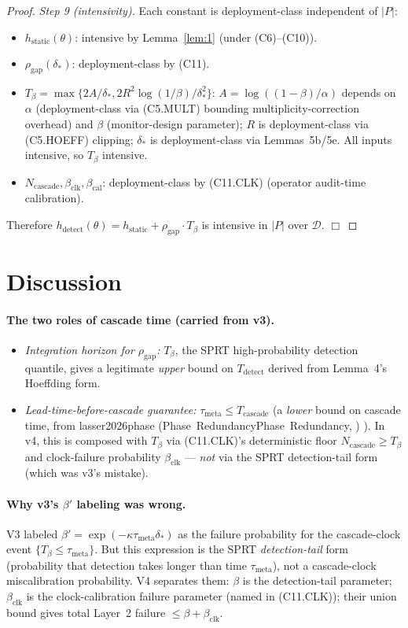 \documentclass{article}
\makeatletter
\newcommand{\citep}[2][]{%
  \begingroup
  \def\@tmpkey{#2}%
  \ifx\@tmpkey\@empty\else
    (\ifx\@empty#1\@empty\else #1, \fi
     \@nameuse{bibkey@\@tmpkey})%
  \fi
  \endgroup
}
\newcommand{\deltastar}{\delta_{*}}
\newcommand{\rhogap}{\rho_{\mathrm{gap}}}
\newcommand{\Tbeta}{T_{\beta}}
\newcommand{\Ncasc}{N_{\mathrm{cascade}}}
\newcommand{\bclk}{\beta_{\mathrm{clk}}}
\newcommand{\bcal}{\beta_{\mathrm{cal}}}
\makeatother
\begin{document}
\begin{proof}
\emph{Step 9 (intensivity).}  Each constant is deployment-class
independent of $|P|$:
\begin{itemize}
\item $h_{\mathrm{static}}(\theta)$: intensive by Lemma~\ref{lem:1}
  (under (C6)--(C10)).
\item $\rhogap(\deltastar)$: deployment-class by (C11).
\item $\Tbeta = \max\{2A/\deltastar, 2R^2\log(1/\beta)/\deltastar^2\}$:
  $A = \log((1-\beta)/\alpha)$ depends on $\alpha$ (deployment-class
  via (C5.MULT) bounding multiplicity-correction overhead) and
  $\beta$ (monitor-design parameter); $R$ is deployment-class via
  (C5.HOEFF) clipping; $\deltastar$ is deployment-class via
  Lemmas~5b/5e.  All inputs intensive, so $\Tbeta$ intensive.
\item $\Ncasc, \bclk, \bcal$: deployment-class by (C11.CLK)
  (operator audit-time calibration).
\end{itemize}
Therefore $h_{\mathrm{detect}}(\theta) = h_{\mathrm{static}} +
\rhogap \cdot \Tbeta$ is intensive in $|P|$ over $\mathcal{D}$.
$\Box$
\end{proof}

\section{Discussion}

\paragraph{The two roles of cascade time (carried from v3).}
\begin{itemize}
\item \emph{Integration horizon for $\rhogap$:} $\Tbeta$, the SPRT
  high-probability detection quantile, gives a legitimate
  \emph{upper} bound on $T_{\mathrm{detect}}$ derived from
  Lemma~4's Hoeffding form.
\item \emph{Lead-time-before-cascade guarantee:}
  $\tau_{\mathrm{meta}} \leq T_{\mathrm{cascade}}$ (a \emph{lower}
  bound on cascade time, from
  \citep[Phase~Redundancy]{lasser2026phase}).  In v4, this is
  composed with $\Tbeta$ via (C11.CLK)'s deterministic floor
  $\Ncasc \geq \Tbeta$ and clock-failure probability $\bclk$ —
  \emph{not} via the SPRT detection-tail form (which was v3's
  mistake).
\end{itemize}

\paragraph{Why v3's $\beta'$ labeling was wrong.}
V3 labeled $\beta' = \exp(-\kappa \tau_{\mathrm{meta}} \deltastar)$
as the failure probability for the cascade-clock event $\{\Tbeta
\leq \tau_{\mathrm{meta}}\}$.  But this expression is the SPRT
\emph{detection-tail} form (probability that detection takes longer
than time $\tau_{\mathrm{meta}}$), not a cascade-clock
miscalibration probability.  V4 separates them: $\beta$ is the
detection-tail parameter; $\bclk$ is the clock-calibration failure
parameter (named in (C11.CLK)); their union bound gives total
Layer~2 failure $\leq \beta + \bclk$.
\end{document}

